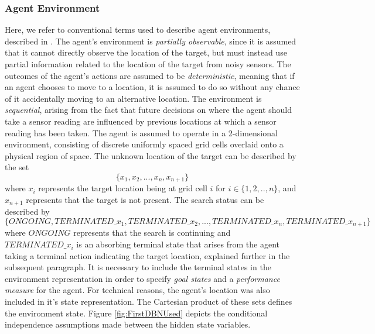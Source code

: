 \subsubsection{Agent Environment}
Here, we refer to conventional terms used to describe agent environments, described in \cite[p.~41]{AIAMA}. The agent's environment is \textit{partially observable}, since it is assumed that it cannot directly observe the location of the target, but must instead use partial information related to the location of the target from noisy sensors. The outcomes of the agent's actions are assumed to be \textit{deterministic}, meaning that if an agent chooses to move to a location, it is assumed to do so without any chance of it accidentally moving to an alternative location. The environment is \textit{sequential}, arising from the fact that future decisions on where the agent should take a sensor reading are influenced by previous locations at which a sensor reading has been taken. The agent is assumed to operate in a 2-dimensional environment, consisting of discrete uniformly spaced grid cells overlaid onto a physical region of space.
The unknown location of the target can be described by the set
\[\{x_1, x_2, ..., x_n, x_{n+1}\}\]
where $x_i$ represents the target location being at grid cell $i$ for $i \in \{1, 2, .., n\}$, and $x_{n+1}$ represents that the target is not present. The search status can be described by 
\[ \{ONGOING, TERMINATED\_x_1, TERMINATED\_x_2, ..., TERMINATED\_x_n, TERMINATED\_x_{n+1}\} \]
where $ONGOING$ represents that the search is continuing and $TERMINATED\_x_i$ is an absorbing terminal state that arises from the agent taking a terminal action indicating the target location, explained further in the subsequent paragraph. It is necessary to include the terminal states in the environment representation in order to specify \textit{goal states} and a \textit{performance measure} for the agent. For technical reasons, the agent's location was also included in it's state representation. The Cartesian product of these sets defines the environment state. Figure \ref{fig:FirstDBNUsed} depicts the conditional independence assumptions made between the hidden state variables.

